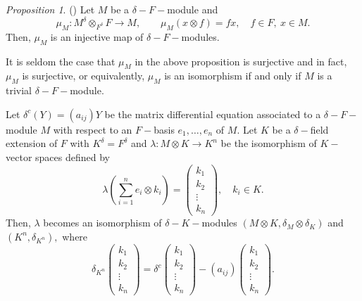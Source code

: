 \documentclass[preprint, 11pt]{amsart}
\theoremstyle{corollary}
\theoremstyle{remark}
\theoremstyle{proposition}
\newtheorem{proposition}[theorem]{Proposition}
\numberwithin{equation}{subsection}
\begin{document}
 

\begin{proposition} (\cite[Chapter II, Corollary 1]{Kol-Book}) Let $M$ be a $\delta-F-$module and \begin{equation*}\mu_M:M^\delta\otimes_{F^{\delta}} F\to M,\qquad \mu_M(x\otimes f)= fx, \quad f\in F, \ x\in M.\end{equation*}
	Then, $\mu_M$ is an injective map of $\delta-F-$modules.
\end{proposition}
It is seldom the case that  $\mu_M$ in  the above proposition is surjective and in fact, $\mu_M$ is  surjective, or equivalently, $\mu_M$ is an isomorphism if and only if $M$ is a trivial $\delta-F-$module. 

Let  $\delta^c(Y)=(a_{ij})Y$ be the matrix differential equation  associated to a $\delta-F-$module $M$ with respect to an $F-$basis $e_1,\dots, e_n$ of $M.$  Let $K$ be a $\delta-$field extension of $F$ with $K^\delta=F^\delta$ and $\lambda: M\otimes K\to K^n$ be the isomorphism of $K-$vector spaces defined by $$\lambda(\sum^n_{i=1}e_i\otimes k_i)= \begin{pmatrix}k_1\\ k_2\\ \vdots\\ k_n\end{pmatrix},\quad k_i\in K.$$ 
Then, $\lambda$ becomes an isomorphism of $\delta-K-$modules $(M\otimes K, \delta_M\otimes \delta_K)$ and $(K^n, \delta_{K^n}),$ where \begin{equation}\label{lambdadefn}\delta_{K^n} \begin{pmatrix}k_1\\ k_2\\ \vdots\\ k_n\end{pmatrix}=\delta^c \begin{pmatrix}k_1\\ k_2\\ \vdots\\ k_n\end{pmatrix}-(a_{ij})\begin{pmatrix}k_1\\ k_2\\ \vdots\\ k_n\end{pmatrix}.\end{equation}
\end{document}
